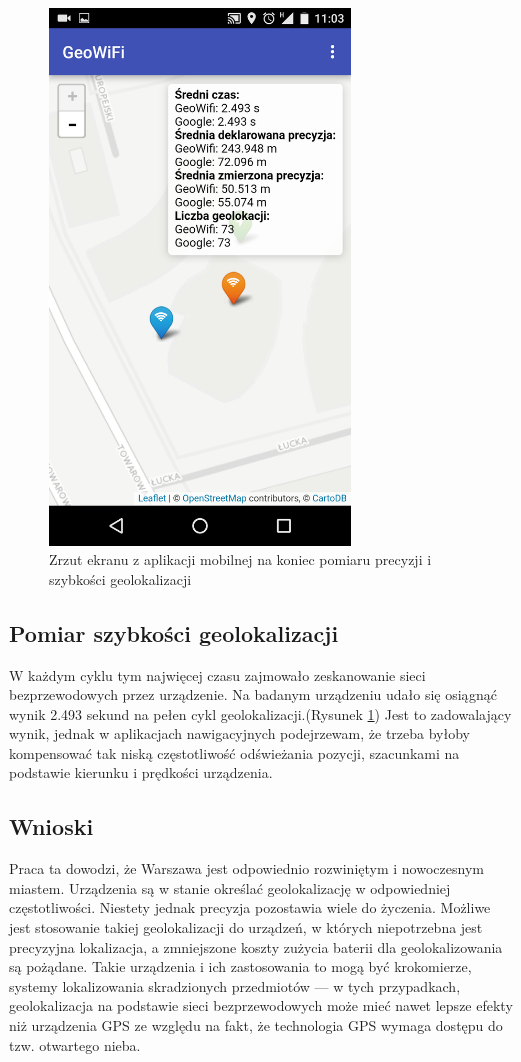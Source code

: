 \begin{figure}[h]
  \centering
    \includegraphics[width=8cm]{images/map-result}
  \caption{Zrzut ekranu z aplikacji mobilnej na koniec pomiaru precyzji i szybkości geolokalizacji}
  \label{fig:mapResult}
\end{figure}

\subsection{Pomiar szybkości geolokalizacji}
W każdym cyklu tym najwięcej czasu zajmowało zeskanowanie sieci bezprzewodowych przez urządzenie. Na badanym urządzeniu udało się osiągnąć wynik 2.493 sekund na pełen cykl geolokalizacji.(Rysunek \ref{fig:mapResult}) Jest to zadowalający wynik, jednak w aplikacjach nawigacyjnych podejrzewam, że trzeba byłoby kompensować tak niską częstotliwość odświeżania pozycji, szacunkami na podstawie kierunku i prędkości urządzenia.

\subsection{Wnioski}
Praca ta dowodzi, że Warszawa jest odpowiednio rozwiniętym i nowoczesnym miastem. Urządzenia są w stanie określać geolokalizację w odpowiedniej częstotliwości. Niestety jednak precyzja pozostawia wiele do życzenia. Możliwe jest stosowanie takiej geolokalizacji do urządzeń, w których niepotrzebna jest precyzyjna lokalizacja, a zmniejszone koszty zużycia baterii dla geolokalizowania są pożądane. Takie urządzenia i ich zastosowania to mogą być krokomierze, systemy lokalizowania skradzionych przedmiotów — w tych przypadkach, geolokalizacja na podstawie sieci bezprzewodowych może mieć nawet lepsze efekty niż urządzenia GPS ze względu na fakt, że technologia GPS wymaga dostępu do tzw. otwartego nieba.

